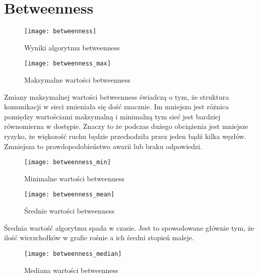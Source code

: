 \section{Betweenness}
\FloatBarrier
\begin{figure}[h]
	\centering
	\texttt{[image: betweenness]}
	\caption{Wyniki algorytmu betweenness}
\end{figure}
\FloatBarrier
\begin{figure}[h]
	\centering
	\texttt{[image: betweenness\_max]}
	\caption{Maksymalne wartości betweenness}
\end{figure}
\FloatBarrier
Zmiany maksymalnej wartości betweenness świadczą o tym, że struktura komunikacji w sieci zmieniała się dość znacznie. Im mniejsza jest różnica pomiędzy wartościami maksymalną i minimalną tym sieć jest bardziej równomierna w dostępie. Znaczy to że podczas dużego obciążenia jest mniejsze ryzyko, że większość ruchu będzie przechodziła przez jeden bądź kilka węzłów. Zmniejsza to prawdopodobieństwo awarii lub braku odpowiedzi.
\FloatBarrier
\begin{figure}[h]
	\centering
	\texttt{[image: betweenness\_min]}
	\caption{Minimalne wartości betweenness}
\end{figure}
\FloatBarrier\FloatBarrier
\begin{figure}[h]
	\centering
	\texttt{[image: betweenness\_mean]}
	\caption{Średnie wartości betweenness}
\end{figure}
\FloatBarrier
Średnia wartość algorytmu spada w czasie. Jest to spowodowane głównie tym, że ilość wierzchołków w grafie rośnie a ich średni stopień maleje.
\FloatBarrier
\begin{figure}[h]
	\centering
	\texttt{[image: betweenness\_median]}
	\caption{Mediana wartości betweenness}
\end{figure}
\FloatBarrier
\newpage
